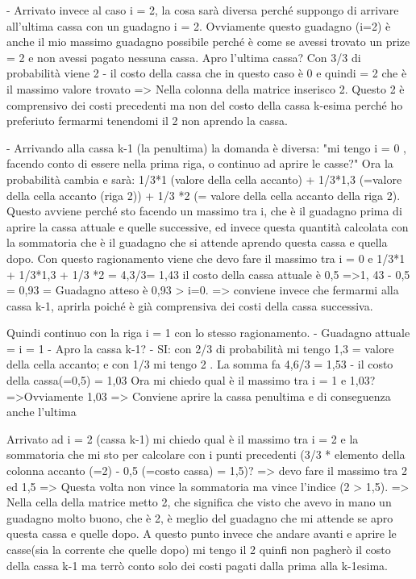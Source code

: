 \documentclass{article}
\begin{document}
    -   Arrivato invece al caso i = 2, la cosa sarà diversa perché suppongo di arrivare all'ultima 
        cassa con un guadagno i = 2. Ovviamente questo guadagno (i=2) è anche il mio massimo guadagno
        possibile perché è come se avessi trovato un prize = 2 e non avessi pagato nessuna cassa.
        Apro l'ultima cassa?
        Con 3/3 di probabilità viene 2 - il costo della cassa che in questo caso è 0 e quindi = 2 che 
        è il massimo valore trovato => Nella colonna della matrice inserisco 2.
        Questo 2 è comprensivo dei costi precedenti ma non del costo della cassa k-esima perché ho preferiuto
        fermarmi tenendomi il 2 non aprendo la cassa.


-   Arrivando alla cassa k-1 (la penultima) la domanda è diversa: "mi tengo i = 0 , facendo conto di essere
    nella prima riga, o continuo ad aprire le casse?"
    Ora la probabilità cambia e sarà: 1/3*1 (valore della cella accanto) + 1/3*1,3 (=valore della cella
    accanto (riga 2)) + 1/3 *2 (= valore della cella accanto della riga 2).
    Questo avviene perché sto facendo un massimo tra i, che è il guadagno prima di aprire la cassa attuale
    e quelle successive, ed invece questa quantità calcolata con la sommatoria che è il guadagno che si attende
    aprendo questa cassa e quella dopo.
    Con questo ragionamento viene che devo fare il massimo tra i = 0 e 1/3*1 + 1/3*1,3 + 1/3 *2 = 4,3/3= 1,43
    il costo della cassa attuale è 0,5 =>1, 43 - 0,5 = 0,93 = Guadagno atteso è 0,93 > i=0.
    => conviene invece che fermarmi alla cassa k-1, aprirla poiché è già comprensiva dei costi della
    cassa successiva.

    Quindi continuo con la riga i = 1 con lo stesso ragionamento.
        -   Guadagno attuale = i = 1
        -   Apro la cassa k-1?
            - SI: con 2/3 di probabilità mi tengo 1,3 = valore della cella accanto; e con 1/3 mi tengo
            2 . La somma fa 4,6/3 = 1,53 - il costo della cassa(=0,5) = 1,03
        Ora mi chiedo qual è il massimo tra i = 1 e 1,03? =>Ovviamente 1,03 => Conviene 
        aprire la cassa penultima e di conseguenza anche l'ultima

    Arrivato ad i = 2 (cassa k-1) mi chiedo qual è il massimo tra i = 2 e la sommatoria che mi sto
    per calcolare con i punti precedenti (3/3 * elemento della colonna accanto (=2) - 0,5 (=costo cassa) = 1,5)?
    => devo fare il massimo tra 2 ed 1,5 => Questa volta non vince la sommatoria ma vince l'indice (2 > 1,5).
    => Nella cella della matrice metto 2, che significa che visto che avevo in mano un guadagno molto buono,
    che è 2, è meglio del guadagno che mi attende se apro questa cassa e quelle dopo.
    A questo punto invece che andare avanti e aprire le casse(sia la corrente che quelle dopo) mi tengo il 2
    quinfi non pagherò il costo della cassa k-1 ma terrò conto solo dei costi pagati dalla prima alla k-1esima.
\end{document}

